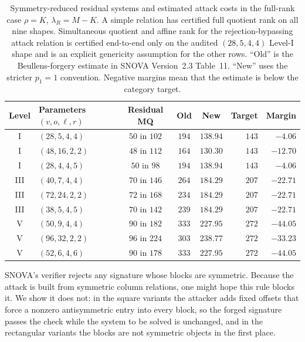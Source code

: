 \documentclass[11pt]{article}
\newcommand{\SNOVA}{\textsf{SNOVA}}
\begin{document}
\begin{table}[t]
\centering
\caption{Symmetry-reduced residual systems and estimated attack costs in the full-rank case $\rho=K$, $\lambda_R=M-K$.  A simple relation has certified full quotient rank on all nine shapes.  Simultaneous quotient and affine rank for the rejection-bypassing attack relation is certified end-to-end only on the audited $(28,5,4,4)$ Level-I shape and is an explicit genericity assumption for the other rows.  ``Old'' is the Beullens-forgery estimate in \SNOVA{} Version~2.3 Table~11.  ``New'' uses the stricter $p_1=1$ convention.  Negative margins mean that the estimate is below the category target.}\label{tab:main}
\small
\setlength{\tabcolsep}{4.2pt}
\begin{tabular}{@{}c l c c c r r@{}}
\toprule
Level & Parameters $(v,o,\ell,r)$ & Residual MQ & Old & New & Target & Margin\\
\midrule
I   & $(28,5,4,4)$   & $50$ in $102$ & $194$ & $138.94$ & $143$ & $-4.06$\\
I   & $(48,16,2,2)$  & $48$ in $112$ & $164$ & $130.30$ & $143$ & $-12.70$\\
I   & $(28,4,4,5)$   & $50$ in $98$  & $194$ & $138.94$ & $143$ & $-4.06$\\
\midrule
III & $(40,7,4,4)$   & $70$ in $146$ & $264$ & $184.29$ & $207$ & $-22.71$\\
III & $(72,24,2,2)$  & $72$ in $168$ & $234$ & $184.29$ & $207$ & $-22.71$\\
III & $(38,5,4,5)$   & $70$ in $142$ & $239$ & $184.29$ & $207$ & $-22.71$\\
\midrule
V   & $(50,9,4,4)$   & $90$ in $182$ & $333$ & $227.95$ & $272$ & $-44.05$\\
V   & $(96,32,2,2)$  & $96$ in $224$ & $303$ & $238.77$ & $272$ & $-33.23$\\
V   & $(52,6,4,6)$   & $90$ in $178$ & $333$ & $227.95$ & $272$ & $-44.05$\\
\bottomrule
\end{tabular}
\end{table}

\SNOVA{}'s verifier rejects any signature whose blocks are symmetric.  Because the attack is built from symmetric column relations, one might hope this rule blocks it.  We show it does not: in the square variants the attacker adds fixed offsets that force a nonzero antisymmetric entry into every block, so the forged signature passes the check while the system to be solved is unchanged, and in the rectangular variants the blocks are not symmetric objects in the first place.
\end{document}
